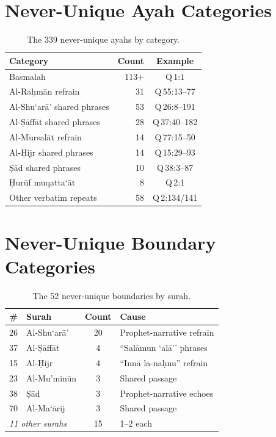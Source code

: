 \documentclass[11pt,a4paper]{article}
\begin{document}
\section{Never-Unique Ayah Categories}
\label{app:never_unique}

\begin{table}[h]
\centering
\small
\begin{tabular}{lrc}
\toprule
\textbf{Category} & \textbf{Count} & \textbf{Example} \\
\midrule
Basmalah & 113+ & Q\,1:1 \\
Al-Ra\d{h}m\=an refrain & 31 & Q\,55:13--77 \\
Al-Shu`ar\=a' shared phrases & 53 & Q\,26:8--191 \\
Al-\d{S}\=aff\=at shared phrases & 28 & Q\,37:40--182 \\
Al-Mursal\=at refrain & 14 & Q\,77:15--50 \\
Al-\d{H}ijr shared phrases & 14 & Q\,15:29--93 \\
\d{S}\=ad shared phrases & 10 & Q\,38:3--87 \\
\d{H}ur\=uf muqatta`\=at & 8 & Q\,2:1 \\
Other verbatim repeats & 58 & Q\,2:134/141 \\
\bottomrule
\end{tabular}
\caption{The 339 never-unique ayahs by category.}
\label{tab:never_unique_cats}
\end{table}

\section{Never-Unique Boundary Categories}
\label{app:never_unique_boundaries}

\begin{table}[h]
\centering
\small
\begin{tabular}{rlcl}
\toprule
\textbf{\#} & \textbf{Surah} & \textbf{Count} & \textbf{Cause} \\
\midrule
26 & Al-Shu`ar\=a' & 20 & Prophet-narrative refrain \\
37 & Al-\d{S}\=aff\=at & 4 & ``Sal\=amun `al\=a'' phrases \\
15 & Al-\d{H}ijr & 4 & ``Inn\=a la-na\d{h}nu'' refrain \\
23 & Al-Mu'min\=un & 3 & Shared passage \\
38 & \d{S}\=ad & 3 & Prophet-narrative echoes \\
70 & Al-Ma`\=arij & 3 & Shared passage \\
\midrule
\multicolumn{2}{l}{\emph{11 other surahs}} & 15 & 1--2 each \\
\bottomrule
\end{tabular}
\caption{The 52 never-unique boundaries by surah.}
\label{tab:never_unique_boundaries}
\end{table}
\end{document}
